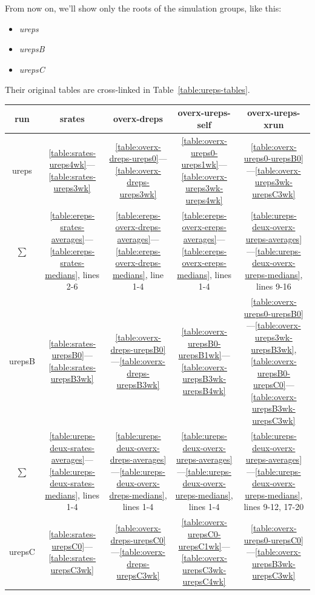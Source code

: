 \documentclass[10pt,oneside]{memoir}
\begin{document}
From now on, we'll show only the roots of the simulation groups, like this:


\begin{itemize}


\item {\itshape ureps}

\item {\itshape urepsB}

\item {\itshape urepsC}
\end{itemize}

Their original tables are cross-linked in Table~\ref{table:ureps-tables}.



\begin{table}
\begin{tabular}{|ccccc|}
\toprule
run & srates & overx-dreps & overx-ureps-self & overx-ureps-xrun \\
\midrule
ureps & \ref{table:srates-ureps4wk}—\ref{table:srates-ureps3wk} & \ref{table:overx-dreps-ureps0}—\ref{table:overx-dreps-ureps3wk} & \ref{table:overx-ureps0-ureps1wk}—\ref{table:overx-ureps3wk-ureps4wk} & \ref{table:overx-ureps0-urepsB0}—\ref{table:overx-ureps3wk-urepsC3wk} \\
$\sum$ & \ref{table:ereps-srates-averages}—\ref{table:ereps-srates-medians}, lines 2-6 & \ref{table:ereps-overx-dreps-averages}—\ref{table:ereps-overx-dreps-medians}, line 1-4 & \ref{table:ereps-overx-ereps-averages}—\ref{table:ereps-overx-ereps-medians}, lines 1-4 & \ref{table:ureps-deux-overx-ureps-averages}—\ref{table:ureps-deux-overx-ureps-medians}, lines 9-16 \\
\hline
urepsB & \ref{table:srates-urepsB0}—\ref{table:srates-urepsB3wk} & \ref{table:overx-dreps-urepsB0}—\ref{table:overx-dreps-urepsB3wk} & \ref{table:overx-urepsB0-urepsB1wk}—\ref{table:overx-urepsB3wk-urepsB4wk} & \ref{table:overx-ureps0-urepsB0}—\ref{table:overx-ureps3wk-urepsB3wk}, \ref{table:overx-urepsB0-urepsC0}—\ref{table:overx-urepsB3wk-urepsC3wk} \\
$\sum$ & \ref{table:ureps-deux-srates-averages}—\ref{table:ureps-deux-srates-medians}, lines 1-4 & \ref{table:ureps-deux-overx-dreps-averages}—\ref{table:ureps-deux-overx-dreps-medians}, lines 1-4 & \ref{table:ureps-deux-overx-ureps-averages}—\ref{table:ureps-deux-overx-ureps-medians}, lines 1-4 & \ref{table:ureps-deux-overx-ureps-averages}—\ref{table:ureps-deux-overx-ureps-medians}, lines 9-12, 17-20 \\
\hline
urepsC & \ref{table:srates-urepsC0}—\ref{table:srates-urepsC3wk} & \ref{table:overx-dreps-urepsC0}—\ref{table:overx-dreps-urepsC3wk} & \ref{table:overx-urepsC0-urepsC1wk}—\ref{table:overx-urepsC3wk-urepsC4wk} & \ref{table:overx-ureps0-urepsC0}—\ref{table:overx-urepsB3wk-urepsC3wk} \\

\end{tabular}
\end{table}
\end{document}
